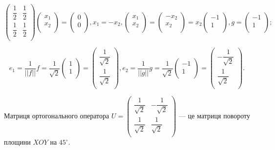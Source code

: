 $$\begin{pmatrix}
	\dfrac{1}{2} & \dfrac{1}{2} \\
	\dfrac{1}{2} & \dfrac{1}{2} \\
\end{pmatrix} \begin{pmatrix}
	x_1 \\
	x_2 \\
\end{pmatrix} = \begin{pmatrix}
	0 \\
	0 \\
\end{pmatrix}, x_1 = -x_2, \begin{pmatrix}
	x_1 \\
	x_2 \\
\end{pmatrix} = \begin{pmatrix}
	-x_2 \\
	x_2 \\
\end{pmatrix} = x_2 \begin{pmatrix}
	-1 \\
	1 \\
\end{pmatrix}, g = \begin{pmatrix}
	-1 \\
	1 \\
\end{pmatrix};$$

$$e_1 = \dfrac{1}{||f||}f = \dfrac{1}{\sqrt{2}} \begin{pmatrix}
	1 \\
	1 \\
\end{pmatrix} = \begin{pmatrix}
	\dfrac{1}{\sqrt{2}} \\
	\dfrac{1}{\sqrt{2}} \\
\end{pmatrix}, e_2 = \dfrac{1}{||g||}g = \dfrac{1}{\sqrt{2}} \begin{pmatrix}
	-1 \\
	1 \\
\end{pmatrix} = \begin{pmatrix}
	-\dfrac{1}{\sqrt{2}} \\
	\dfrac{1}{\sqrt{2}} \\
\end{pmatrix}.$$

Матриця ортогонального оператора $U = \begin{pmatrix}
	\dfrac{1}{\sqrt{2}} & -\dfrac{1}{\sqrt{2}} \\
	\dfrac{1}{\sqrt{2}} & \dfrac{1}{\sqrt{2}} \\
\end{pmatrix}$ --- це матриця повороту
площини $XOY$ на $45^{\circ}$.

